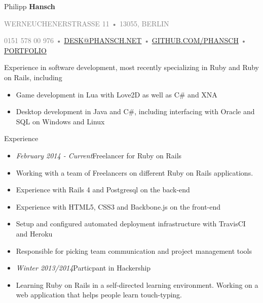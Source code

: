 \documentclass[12pt]{article}
\begin{document}
\thispagestyle{empty}



{\Huge Philipp \textbf{Hansch}}

{\footnotesize
  \textcolor{Gray}{
    \uppercase{Werneuchenerstrasse 11}
    •
    \uppercase{13055, Berlin}
  }

  \textcolor{Gray}{
    0151 578 00 976
    •
    \uppercase{\href{mailto:desk@phansch.net}{desk@phansch.net} }
    •
    \uppercase{\href{http://github.com/phansch}{github.com/phansch}}
    •
    \uppercase{\href{http://portfolio.phansch.net/\#folio-mid}{Portfolio}}
  }
}

\vspace{0.5cm}

Experience in software development, most recently specializing in Ruby and Ruby on Rails, including

\begin{itemize}
  \setlength{\itemsep}{0.1cm}
  \setlength{\parskip}{0.1cm}
  \item Game development in Lua with Love2D as well as C\# and XNA
  \item Desktop development in Java and C\#, including interfacing with Oracle and SQL on Windows and Linux
\end{itemize}
\vspace{0.5cm}

{\Large Experience}
\begin{itemize}
  \setlength{\itemsep}{0cm}
  \setlength{\parskip}{0cm}

  \item[] \emph{February 2014 - Current}\hfill Freelancer for Ruby on Rails
  \item[] Working with a team of Freelancers on different Ruby on Rails applications.
  \item[] Experience with Rails 4 and Postgresql on the back-end
  \item[] Experience with HTML5, CSS3 and Backbone.js on the front-end
  \item[] Setup and configured automated deployment infrastructure with TravisCI and Heroku
  \item[] Responsible for picking team communication and project management tools
\end{itemize}

\begin{itemize}
  \setlength{\itemsep}{0cm}
  \setlength{\parskip}{0cm}

  \item[] \emph{Winter 2013/2014}\hfill Particpant in Hackership
  \item[] Learning Ruby on Rails in a self-directed learning environment. Working on a web application that helps people learn touch-typing.
\end{itemize}
\end{document}
